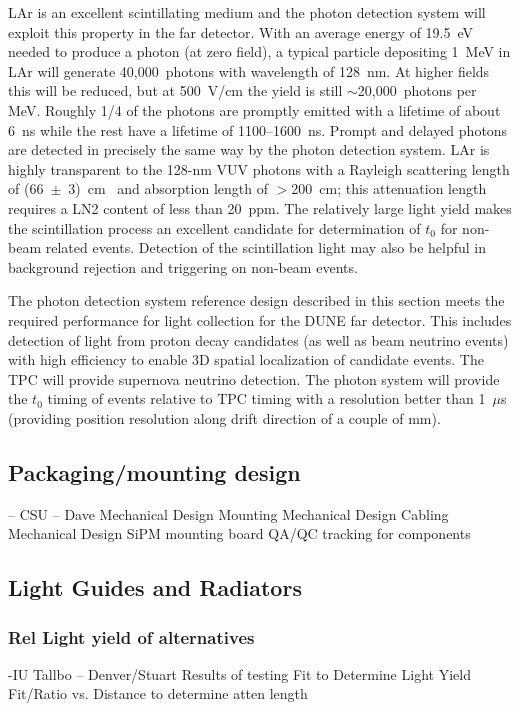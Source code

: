 LAr is an excellent scintillating medium and the photon detection
system will exploit this property in the far detector.  With an
average energy of 19.5~eV needed to produce a photon (at zero field),
a typical particle depositing 1~MeV in LAr will generate
40,000~photons with wavelength of 128~nm. At higher fields this will
be reduced, but at 500~V/cm the yield is still $\sim$20,000~photons
per MeV. Roughly 1/4 of the photons are promptly emitted with a
lifetime of about 6~ns while the rest have a lifetime of
1100--1600~ns. Prompt and delayed photons are detected in
  precisely the same way by the photon detection system. LAr is
highly transparent to the 128-nm VUV photons with a Rayleigh
scattering length of (66~$\pm$~3)~cm~\cite{Rayleigh} and absorption
length of $>$200~cm; this attenuation length requires a LN2
  content of less than 20~ppm. The relatively large light yield makes
the scintillation process an excellent candidate for determination of
$t_0$ for non-beam related events. Detection of the scintillation
light may also be helpful in background rejection and triggering on
non-beam events.

The photon detection system reference design described in this section
meets the required performance for light collection for the DUNE far
detector. This includes detection of light from proton decay
candidates (as well as beam neutrino events) with high efficiency to
enable 3D spatial localization of candidate events. The TPC will
provide supernova neutrino detection. 
The photon system will provide the $t_0$ timing of
events relative to TPC timing with a resolution better than 1~$\mu$s
(providing position resolution along drift direction of a couple of mm). 


\subsection{Packaging/mounting design}
      -- CSU  -- Dave
     Mechanical Design Mounting 
     Mechanical Design Cabling
     Mechanical Design SiPM mounting board
     QA/QC tracking for components

\subsection{Light Guides and Radiators}

\subsubsection{Rel Light yield of alternatives}
      -IU Tallbo -- Denver/Stuart
     Results of testing
     Fit to Determine Light Yield
     Fit/Ratio vs. Distance to determine atten length     

